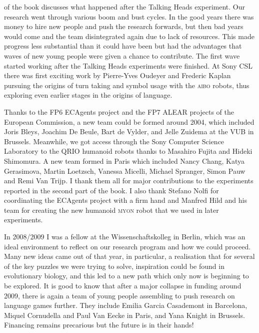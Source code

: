  of the book discusses what happened after the Talking Heads experiment. Our research went through various 
boom and bust cycles. In the good years there was money to hire new people and push the research forwards, but then 
bad years would come and the team disintegrated again due to lack of resources. This made progress less substantial than it
could have been but had the advantages that waves of new young people were given a chance to contribute. The first wave 
started working after the Talking Heads experiments were finished. At Sony CSL there was first exciting work by Pierre-Yves Oudeyer 
and Frederic Kaplan pursuing the origins of turn taking and symbol usage with the \textsc{aibo} robots, thus exploring even earlier 
stages in the origins of language. 

Thanks to the FP6 ECAgents project and the FP7 ALEAR projects of the European Commission, a new 
team could be formed around 2004, which included Joris Bleys, Joachim De Beule, Bart de Vylder, and Jelle Zuidema at the 
VUB in Brussels. Meanwhile, we got access through the Sony Computer Science Laboratory to the QRIO humanoid robots 
thanks to Masahiro Fujita and Hideki Shimomura. A new team formed in Paris which included Nancy Chang, Katya Gerasimova, Martin Loetzsch, 
Vanessa Micelli, Michael Spranger, Simon Pauw and Remi Van Trijp. I thank them all for major contributions to the experiments reported 
in the second part of the book. I also thank Stefano Nolfi for coordinating the ECAgents project with a firm hand 
and Manfred Hild and his team for creating the new humanoid \textsc{myon} robot that we used in later experiments. 

In 2008/2009 I was a fellow at the Wissenschaftskolleg in Berlin, which was an ideal environment to reflect on our research 
program and how we could proceed. Many new ideas came out of that year, in particular, a realisation that for several of the key
puzzles we were trying to solve, inspiration could be found in evolutionary biology, and this led to a new path which only now 
is beginning to be explored. It is good to know that after a major collapse in funding around 2009, there is 
again a team of young people assembling to push research on language games further. They include Emilia Garcia Casademont in 
Barcelona, Miquel Cornudella and Paul Van Eecke in Paris, and Yana Knight in Brussels. Financing remains precarious 
but the future is in their hands! 

